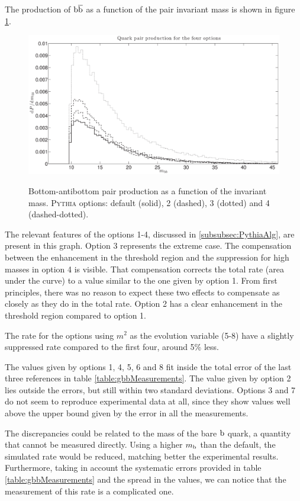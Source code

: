 \documentclass[a4paper,12pt]{article}
\begin{document}
The production of ${\mathrm b}\overline{\mathrm b}$ as a function of the pair invariant mass is shown in figure \ref{fig:QMass}.

\begin{figure}[h]
\centering
\caption[Bottom quark pair production (four options).]{Bottom-antibottom pair production as a function of the invariant mass. \textsc{Pythia} options: default (solid), 2 (dashed), 3 (dotted) and 4 (dashed-dotted).}
\includegraphics[width=15cm]{QMass.eps}
\label{fig:QMass}
\end{figure}
The relevant features of the options 1-4, discussed in \ref{subsubsec:PythiaAlg}, are present in this graph. Option 3 represents the extreme case. The compensation between the enhancement in the threshold region and the suppression for high masses in option 4 is visible. That compensation corrects the total rate (area under the curve) to a value similar to the one given by option 1. From first principles, there was no reason to expect these two effects to compensate as closely as they do in the total rate. Option 2 has a clear enhancement in the threshold region compared to option 1.

The rate for the options using $m^2$ as the evolution variable (5-8) have a slightly suppressed rate compared to the first four, around 5\% less.

The values given by options 1, 4, 5, 6 and 8 fit inside the total error of the last three references in table \ref{table:gbbMeasurements}. The value given by option 2 lies outside the errors, but still within two standard deviations. Options 3 and 7 do not seem to reproduce experimental data at all, since they show values well above the upper bound given by the error in all the measurements.

The discrepancies could be related to the mass of the bare ${\mathrm b}$ quark, a quantity that cannot be measured directly. Using a higher $m_{\mathrm b}$ than the default, the simulated rate would be reduced, matching better the experimental results. Furthermore, taking in account the systematic errors provided in table \ref{table:gbbMeasurements} and the spread in the values, we can notice that the measurement of this rate is a complicated one. 
\end{document}

